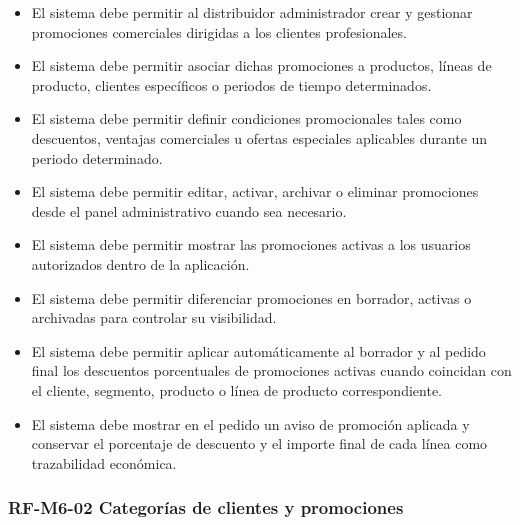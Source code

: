 \begin{itemize}
    \item El sistema debe permitir al distribuidor administrador crear y gestionar promociones comerciales dirigidas a los clientes profesionales.
    \item El sistema debe permitir asociar dichas promociones a productos, líneas de producto, clientes específicos o periodos de tiempo determinados.
    \item El sistema debe permitir definir condiciones promocionales tales como descuentos, ventajas comerciales u ofertas especiales aplicables durante un periodo determinado.
    \item El sistema debe permitir editar, activar, archivar o eliminar promociones desde el panel administrativo cuando sea necesario.
    \item El sistema debe permitir mostrar las promociones activas a los usuarios autorizados dentro de la aplicación.
    \item El sistema debe permitir diferenciar promociones en borrador, activas o archivadas para controlar su visibilidad.
    \item El sistema debe permitir aplicar automáticamente al borrador y al pedido final los descuentos porcentuales de promociones activas cuando coincidan con el cliente, segmento, producto o línea de producto correspondiente.
    \item El sistema debe mostrar en el pedido un aviso de promoción aplicada y conservar el porcentaje de descuento y el importe final de cada línea como trazabilidad económica.
\end{itemize}

\vspace{-0.75em}
\subsubsection{RF-M6-02 Categorías de clientes y promociones}
\vspace{-1em}

